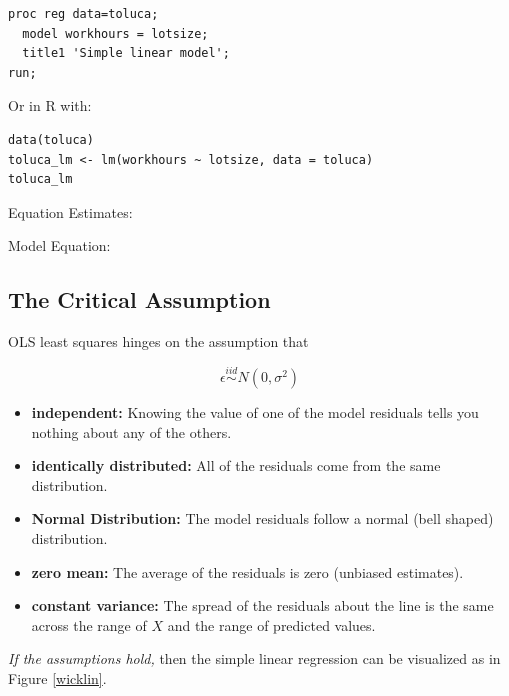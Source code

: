 \documentclass[12pt]{../notes}
\begin{document}
\begin{verbatim}
proc reg data=toluca;
  model workhours = lotsize;
  title1 'Simple linear model';
run;
\end{verbatim}

Or in R with:
\begin{verbatim}
data(toluca)
toluca_lm <- lm(workhours ~ lotsize, data = toluca)
toluca_lm
\end{verbatim}

\nspace
Equation Estimates:

\begin{minipage}[l][1cm][c]{\textwidth}
\end{minipage}

\nspace
Model Equation:

\begin{minipage}[l][1cm][c]{\textwidth}
\end{minipage}

\subsection*{The Critical Assumption}
OLS least squares hinges on the assumption that

\[\epsilon \stackrel{iid}{\sim} N(0, \sigma^2)\]

\begin{itemize}
\item \textbf{independent:} Knowing the value of one of the model residuals tells you nothing about any of the others. 
\item \textbf{identically distributed:} All of the residuals come from the same distribution.
\item \textbf{Normal Distribution:} The model residuals follow a normal (bell shaped) distribution. 
\item \textbf{zero mean:} The average of the residuals is zero (unbiased estimates). 
\item \textbf{constant variance:} The spread of the residuals about the line is the same across the range of $X$ and the range of predicted values. 
\end{itemize}

\textit{If the assumptions hold,} then the simple linear regression can be visualized as in Figure \ref{wicklin}.
\end{document}
